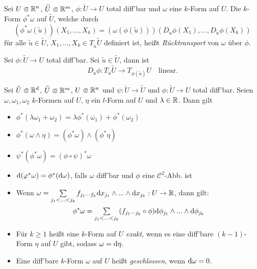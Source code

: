 \documentclass{cheat-sheet}
\begin{document}
\begin{defn}
  Sei $U \opn \R^n$, $\widetilde{U} \opn \R^m$, $\phi : \widetilde{U} \to U$ total diff'bar und $\omega$ eine $k$-Form auf $U$. Die $k$-Form $\phi^* \omega$ auf $\widetilde{U}$, welche durch
  \[ (\phi^* \omega (\widetilde{u})) (X_1, ..., X_k) = (\omega (\phi(\widetilde{u})))(D_{\widetilde{u}} \phi (X_1), ..., D_{\widetilde{u}} \phi (X_k))  \]
  für alle $\widetilde{u} \in \widetilde{U}$, $X_1, ..., X_k \in T_{\widetilde{u}} \widetilde{U}$ definiert ist, heißt \emph{Rücktransport} von $\omega$ über $\phi$.
\end{defn}

\begin{anmerkung}
  Sei $\phi : \widetilde{U} \to U$ total diff'bar. Sei $\widetilde{u} \in \widetilde{U}$, dann ist
  \[ D_{\widetilde{u}} \phi : T_{\widetilde{u}} \widetilde{U} \to T_{\phi(\widetilde{u})} U \quad \text{linear}. \]
\end{anmerkung}

\begin{satz}

  Sei $\check{U} \opn \R^d$, $\widetilde{U} \opn \R^m$, $U \opn \R^n$ und $\psi : \check{U} \to \widetilde{U}$ und $\phi : \widetilde{U} \to U$ total diff'bar.
  Seien $\omega, \omega_1, \omega_2$ $k$-Formen auf $U$, $\eta$ ein $l$-Form auf $U$ und $\lambda \in \mathbb{R}$. Dann gilt

  \begin{itemize}
    \item $\phi^*(\lambda \omega_1 + \omega_2) = \lambda \phi^*(\omega_1) + \phi^*(\omega_2)$ 
    \item $\phi^*(\omega \wedge \eta) = (\phi^* \omega) \wedge (\phi^* \eta)$ 
    \item $\psi^*(\phi^* \omega) = (\phi \circ \psi)^* \omega$ 
    \item $\mathrm{d} (\varphi^* \omega) = \phi^* (\mathrm{d} \omega)$, falls $\omega$ diff'bar und $\phi$ eine $\mathcal{C}^2$-Abb. ist
    \item Wenn $\omega = \sum_{j_1 < ... < j_k} f_{j_1 \cdots f_k} \d x_{j_1} \wedge ... \wedge \d x_{j_k} : U \to \R$, dann gilt:
    \[ \phi^* \omega = \sum_{j_1 < ... < j_k} (f_{j_1 \cdots j_k} \circ \phi) \d \phi_{j_1} \wedge ... \wedge \d \phi_{j_k} \]
  \end{itemize}
\end{satz}

\begin{defn}
  \begin{itemize}
    \item Für $k \geq 1$ heißt eine $k$-Form auf $U$ \emph{exakt}, wenn es eine diff'bare $(k{-}1)$-Form $\eta$ auf $U$ gibt, sodass $\omega = \mathrm{d} \eta$.
    \item Eine diff'bare $k$-Form $\omega$ auf $U$ heißt \emph{geschlossen}, wenn $\mathrm{d} \omega = 0$.
  \end{itemize}
\end{defn}
\end{document}
